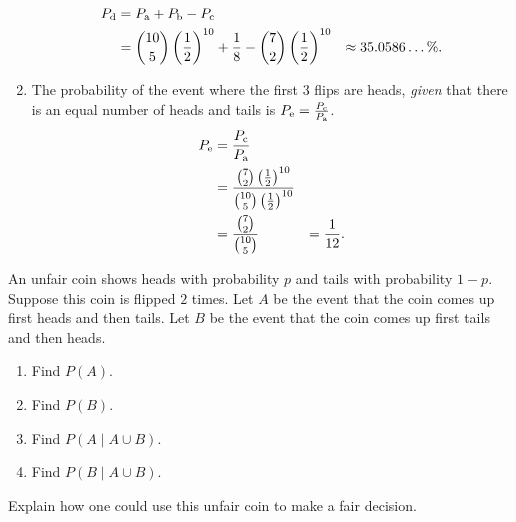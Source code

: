 \documentclass{article}
\theoremstyle{definition}
\begin{document}
\begin{solution}
\begin{enumerate}
\begin{align*}
P_{\rm d}
&=P_{\rm a}+P_{\rm b}-P_{\rm c}\\
&=\binom{10}{5}\left(\frac{1}{2}\right)^{10}+\frac{1}{8}-\binom{7}{2}\left(\frac{1}{2}\right)^{10}
&\approx 35.0586\dots\%.
\end{align*}
\item The probability of the event where the first 3 flips are heads,\textit{ given }that there is an equal number of heads and tails is $P_{\rm e}=\frac{P_{\rm c}}{P_{\rm a}}$.
\begin{align*}
P_{\rm e}
&=\frac{P_{\rm c}}{P_{\rm a}}\\
&=\frac{\binom{7}{2}\left(\frac{1}{2}\right)^{10}}{\binom{10}{5}\left(\frac{1}{2}\right)^{10}}\\
&=\frac{\binom{7}{2}}{\binom{10}{5}}
&=\frac{1}{12}.
\end{align*}
\end{enumerate}
\end{solution}
\begin{question}
    An unfair coin shows heads with probability $p$ and tails with probability
    $1-p$. Suppose this coin is flipped $2$ times. Let $A$ be the event that the coin comes up first heads and
    then tails.  Let $B$ be the event that the coin comes up first tails and
    then heads.
    \begin{enumerate}
        \item  Find $P(A)$.
        \item  Find $P(B)$.
        \item  Find $P(A \mid A \cup B)$.
        \item  Find $P(B \mid A \cup B)$.
    \end{enumerate}
    Explain how one could use this unfair coin to make a fair decision.
\end{question}
\end{document}
